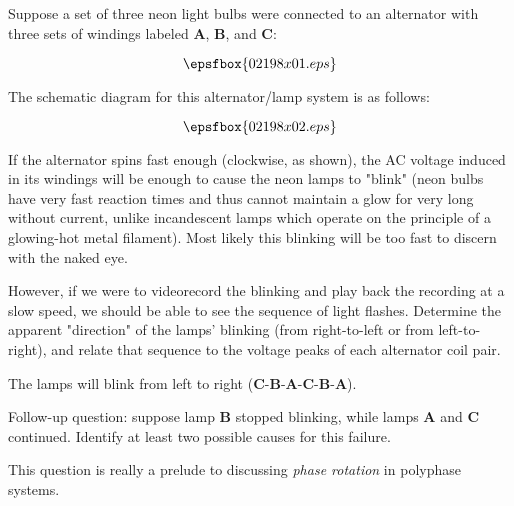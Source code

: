 

Suppose a set of three neon light bulbs were connected to an alternator with three sets of windings labeled {\bf A}, {\bf B}, and {\bf C}:

$$\epsfbox{02198x01.eps}$$

The schematic diagram for this alternator/lamp system is as follows:

$$\epsfbox{02198x02.eps}$$

If the alternator spins fast enough (clockwise, as shown), the AC voltage induced in its windings will be enough to cause the neon lamps to "blink" (neon bulbs have very fast reaction times and thus cannot maintain a glow for very long without current, unlike incandescent lamps which operate on the principle of a glowing-hot metal filament).  Most likely this blinking will be too fast to discern with the naked eye.

However, if we were to videorecord the blinking and play back the recording at a slow speed, we should be able to see the sequence of light flashes.  Determine the apparent "direction" of the lamps' blinking (from right-to-left or from left-to-right), and relate that sequence to the voltage peaks of each alternator coil pair.







The lamps will blink from left to right ({\bf C}-{\bf B}-{\bf A}-{\bf C}-{\bf B}-{\bf A}).

\vskip 10pt

Follow-up question: suppose lamp {\bf B} stopped blinking, while lamps {\bf A} and {\bf C} continued.  Identify at least two possible causes for this failure.







This question is really a prelude to discussing {\it phase rotation} in polyphase systems.




